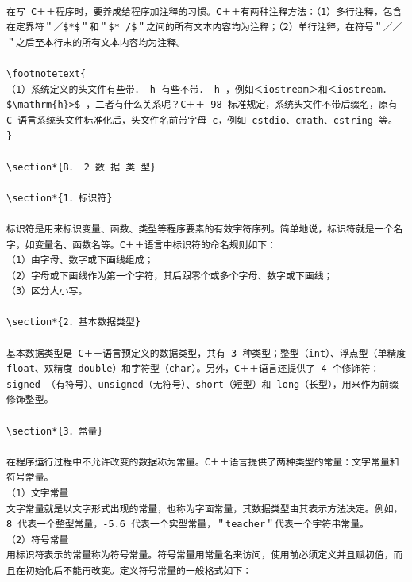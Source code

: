 \documentclass[10pt]{article}
\let\svthefootnote\thefootnote
\newcommand\blfootnotetext[1]{%
  \let\thefootnote\relax\footnote{#1}%
  \addtocounter{footnote}{-1}%
  \let\thefootnote\svthefootnote%
}
\let\svfootnotetext\footnotetext
\renewcommand\footnotetext[2][?]{%
  \if\relax#1\relax%
    \ifnum\value{footnote}=0\blfootnotetext{#2}\else\svfootnotetext{#2}\fi%
  \else%
    \if?#1\ifnum\value{footnote}=0\blfootnotetext{#2}\else\svfootnotetext{#2}\fi%
    \else\svfootnotetext[#1]{#2}\fi%
  \fi
}
\begin{document}
\begin{verbatim}

在写 C＋＋程序时，要养成给程序加注释的习惯。C＋＋有两种注释方法：（1）多行注释，包含在定界符＂／$*$＂和＂$* /$＂之间的所有文本内容均为注释；（2）单行注释，在符号＂／／＂之后至本行末的所有文本内容均为注释。

\footnotetext{
（1）系统定义的头文件有些带． h 有些不带． h ，例如＜iostream＞和＜iostream． $\mathrm{h}>$ ，二者有什么关系呢？C＋＋ 98 标准规定，系统头文件不带后缀名，原有 C 语言系统头文件标准化后，头文件名前带字母 c，例如 cstdio、cmath、cstring 等。
}

\section*{B． 2 数 据 类 型}

\section*{1．标识符}

标识符是用来标识变量、函数、类型等程序要素的有效字符序列。简单地说，标识符就是一个名字，如变量名、函数名等。C＋＋语言中标识符的命名规则如下：
（1）由字母、数字或下画线组成；
（2）字母或下画线作为第一个字符，其后跟零个或多个字母、数字或下画线；
（3）区分大小写。

\section*{2．基本数据类型}

基本数据类型是 C＋＋语言预定义的数据类型，共有 3 种类型；整型（int）、浮点型（单精度 float、双精度 double）和字符型（char）。另外，C＋＋语言还提供了 4 个修饰符：signed （有符号）、unsigned（无符号）、short（短型）和 long（长型），用来作为前缀修饰整型。

\section*{3．常量}

在程序运行过程中不允许改变的数据称为常量。C＋＋语言提供了两种类型的常量：文字常量和符号常量。
（1）文字常量
文字常量就是以文字形式出现的常量，也称为字面常量，其数据类型由其表示方法决定。例如， 8 代表一个整型常量，-5.6 代表一个实型常量，＂teacher＂代表一个字符串常量。
（2）符号常量
用标识符表示的常量称为符号常量。符号常量用常量名来访问，使用前必须定义并且赋初值，而且在初始化后不能再改变。定义符号常量的一般格式如下：
\end{verbatim}
\end{document}
